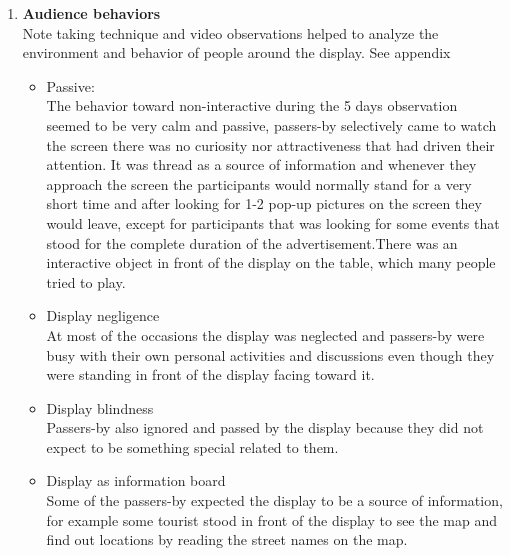 \begin{enumerate}
\begin{enumerate}
\end{enumerate}


\item \textbf{Audience behaviors} \\
Note taking technique and video observations helped to analyze the environment and behavior of people around the display. 
See appendix  %

\begin{itemize}

\item Passive: \\
The behavior toward non-interactive during the 5 days observation seemed to be very calm and passive, passers-by selectively came to watch the screen there was no curiosity nor attractiveness that had driven their attention. It was thread as a source of information and whenever they approach the screen the participants would normally stand for a very short time and after looking for 1-2 pop-up pictures on the screen they would leave, except for participants that was looking for some events that stood for the complete duration of the advertisement.There was an interactive object in front of the display on the table, which many people tried to play.


\item Display negligence  \\
At most of the occasions the display was neglected and passers-by were busy with their own personal activities and discussions even though they were standing in front of the display facing toward it.

\item Display blindness \\
Passers-by also ignored and passed by the display because they did not expect to be something special related to them.

\item Display as information board \\
Some of the passers-by expected the display to be a source of information, for example some tourist stood in front of the display to see the map and find out locations by reading the street names on the map.

\end{itemize}


\end{enumerate}

